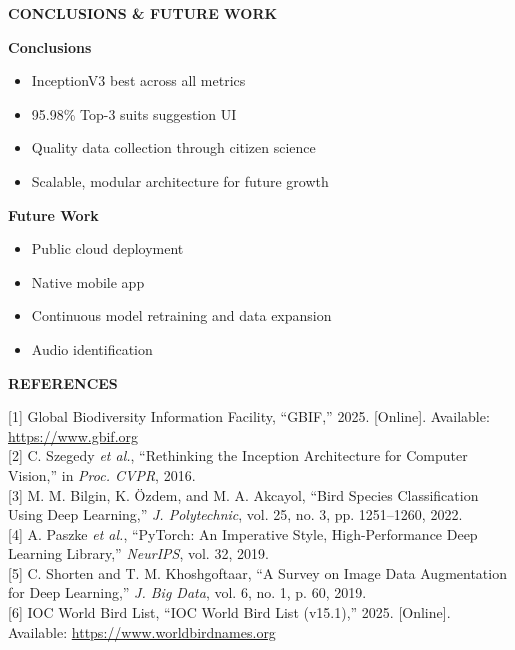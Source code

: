 \documentclass[final]{beamer}
\newcommand{\cardlabel}[1]{%
  {\fontsize{22}{26}\selectfont\bfseries\color{brand}\MakeUppercase{#1}}%
  \vspace{4pt}\par
}
\newlength{\colW}    \setlength{\colW}{22.8cm}  %
\newlength{\vgap}    \setlength{\vgap}{0.40cm}
\begin{document}
\begin{frame}[t]{}
\begin{minipage}[t]{\colW}
  \cardlabel{Conclusions \& Future Work}
  \begin{tcolorbox}[card]
    \begin{minipage}[t]{0.48\linewidth}
      {\small\textbf{Conclusions}
      \begin{itemize}[leftmargin=1em, itemsep=2pt, topsep=3pt,
                      label=\textcolor{brand}{\textbullet}]
        \item InceptionV3 best across all metrics
        \item 95.98\% Top-3 suits suggestion UI
        \item Quality data collection through citizen science
        \item Scalable, modular architecture for future growth
      \end{itemize}}
    \end{minipage}%
    \hfill
    \begin{minipage}[t]{0.48\linewidth}
      {\small\textbf{Future Work}
      \begin{itemize}[leftmargin=1em, itemsep=2pt, topsep=3pt,
                      label=\textcolor{brand}{\textbullet}]
        \item Public cloud deployment
        \item Native mobile app
        \item Continuous model retraining and data expansion
        \item Audio identification
      \end{itemize}}
    \end{minipage}
  \end{tcolorbox}

  \vspace{\vgap}

  \cardlabel{References}
  \begin{tcolorbox}[card]
    {\scriptsize\color{subtext}
    [1] Global Biodiversity Information Facility, ``GBIF,'' 2025. [Online]. Available: \url{https://www.gbif.org}\\[2pt]
    [2] C. Szegedy \textit{et al.}, ``Rethinking the Inception Architecture for Computer Vision,'' in \textit{Proc. CVPR}, 2016.\\[2pt]
    [3] M. M. Bilgin, K. {\"O}zdem, and M. A. Akcayol, ``Bird Species Classification Using Deep Learning,'' \textit{J. Polytechnic}, vol. 25, no. 3, pp. 1251--1260, 2022.\\[2pt]
    [4] A. Paszke \textit{et al.}, ``PyTorch: An Imperative Style, High-Performance Deep Learning Library,'' \textit{NeurIPS}, vol. 32, 2019.\\[2pt]
    [5] C. Shorten and T. M. Khoshgoftaar, ``A Survey on Image Data Augmentation for Deep Learning,'' \textit{J. Big Data}, vol. 6, no. 1, p. 60, 2019.\\[2pt]
    [6] IOC World Bird List, ``IOC World Bird List (v15.1),'' 2025. [Online]. Available: \url{https://www.worldbirdnames.org}}
  \end{tcolorbox}


\end{minipage}
\end{frame}
\end{document}
